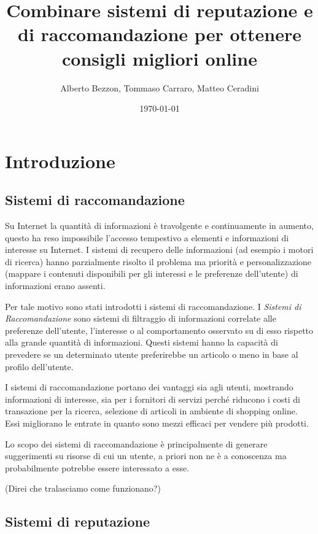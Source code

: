 \documentclass{report}
\author{Alberto Bezzon, Tommaso Carraro, Matteo Ceradini} \title{Combinare sistemi di reputazione e di raccomandazione per ottenere consigli migliori online} \date{\today}
\begin{document}
	\maketitle
	\tableofcontents
	\listoffigures
	\listoftables
	\newpage
	\hypertarget{header-n0}{%
		\section{Introduzione}\label{header-n0}}
	
	\hypertarget{header-n2}{%
		\subsection{Sistemi di raccomandazione}\label{header-n2}}
	
	Su Internet la quantità di informazioni è travolgente e continuamente in
	aumento, questo ha reso impossibile l'accesso tempestivo a elementi e
	informazioni di interesse su Internet. I sistemi di recupero delle
	informazioni (ad esempio i motori di ricerca) hanno parzialmente risolto
	il problema ma priorità e personalizzazione (mappare i contenuti
	disponibili per gli interessi e le preferenze dell'utente) di
	informazioni erano assenti.
	
	Per tale motivo sono stati introdotti i sistemi di raccomandazione. I
	\emph{Sistemi di Raccomandazione} sono sistemi di filtraggio di
	informazioni correlate alle preferenze dell'utente, l'interesse o al
	comportamento osservato su di esso rispetto alla grande quantità di
	informazioni. Questi sistemi hanno la capacità di prevedere se un
	determinato utente preferirebbe un articolo o meno in base al profilo
	dell'utente.
	
	I sistemi di raccomandazione portano dei vantaggi sia agli utenti,
	mostrando informazioni di interesse, sia per i fornitori di servizi
	perché riducono i costi di transazione per la ricerca, selezione di
	articoli in ambiente di shopping online. Essi migliorano le entrate in
	quanto sono mezzi efficaci per vendere più prodotti.
	
	Lo scopo dei sistemi di raccomandazione è principalmente di generare
	suggerimenti su risorse di cui un utente, a priori non ne è a conoscenza
	ma probabilmente potrebbe essere interessato a esse.
	
	(Direi che tralasciamo come funzionano?)
	
	\hypertarget{header-n15}{%
		\subsection{Sistemi di reputazione}\label{header-n15}}
	
\end{document}
